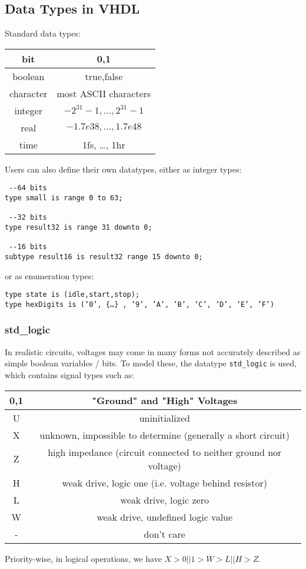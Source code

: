 \documentclass{report}
\newcommand*{\newpar}{\par\vspace{\baselineskip}\noindent} %
\begin{document}
\subsection{Data Types in VHDL}
Standard data types:
\newpar
\begin{tabular}{|c|c|}
    \hline
    bit & 0,1\\\hline
    boolean & true,false\\\hline
    character & most ASCII characters\\\hline
    integer & $-2^31 - 1, \ldots, 2^31-1$\\\hline
    real & $-1.7e38, \ldots, 1.7e48$\\\hline
    time & 1fs, \ldots, 1hr\\\hline
\end{tabular}
\newpar
Users can also define their own datatypes, either as integer types:
\begin{verbatim}
 --64 bits
type small is range 0 to 63;

 --32 bits
type result32 is range 31 downto 0;

 --16 bits
subtype result16 is result32 range 15 downto 0;
\end{verbatim}
or as enumeration types:
\begin{verbatim}
type state is (idle,start,stop);
type hexDigits is (’0’, {…} , ’9’, ’A’, ’B’, ’C’, ’D’, ’E’, ’F’)
\end{verbatim}
\newpar
\subsubsection{std\_logic}
In realistic circuits, voltages may come in many forms not accurately described as simple boolean variables / bits. To model these, the datatype \texttt{std\_logic} is used, which contains signal types such as:
\newpar
\begin{tabular}{|c|c|}
    \hline
    0,1 & "Ground" and "High" Voltages\\\hline
    U & uninitialized\\\hline
    X & unknown, impossible to determine (generally a short circuit)\\\hline
    Z & high impedance (circuit connected to neither ground nor voltage)\\\hline
    H & weak drive, logic one (i.e. voltage behind resistor)\\
    L & weak drive, logic zero\\\hline
    W & weak drive, undefined logic value\\\hline 
    - & don't care\\\hline
\end{tabular}
\newpar
Priority-wise, in logical operations, we have $X > 0 || 1 > W > L || H > Z$.
\newpar
\end{document}

